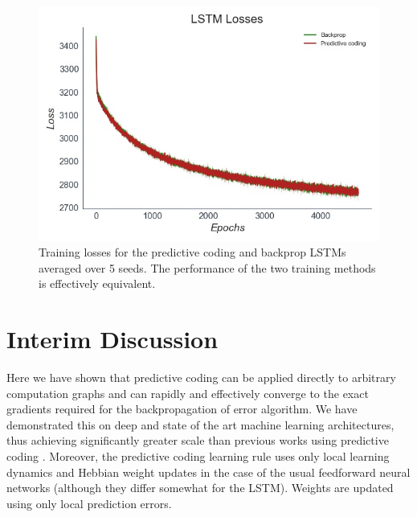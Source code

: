 \begin{figure}[ht]
\label{pcbp_lstm_losses}
  \centering
  \includegraphics[width=0.7\linewidth]{chapter_6_figures/LSTM_Losses_super_prelim_6.jpg}  
\caption{Training losses for the predictive coding and backprop LSTMs averaged over 5 seeds. The performance of the two training methods is effectively equivalent.}
\end{figure}

\section{Interim Discussion}

Here we have shown that predictive coding can be applied directly to arbitrary computation graphs and can rapidly and effectively converge to the exact gradients required for the backpropagation of error algorithm. We have demonstrated this on deep and state of the art machine learning architectures, thus achieving significantly greater scale than previous works using predictive coding \citep{millidge2019implementing,orchard2019making,whittington2017approximation}. Moreover, the predictive coding learning rule uses only local learning dynamics and Hebbian weight updates in the case of the usual feedforward neural networks (although they differ somewhat for the LSTM). Weights are updated using only local prediction errors. 


